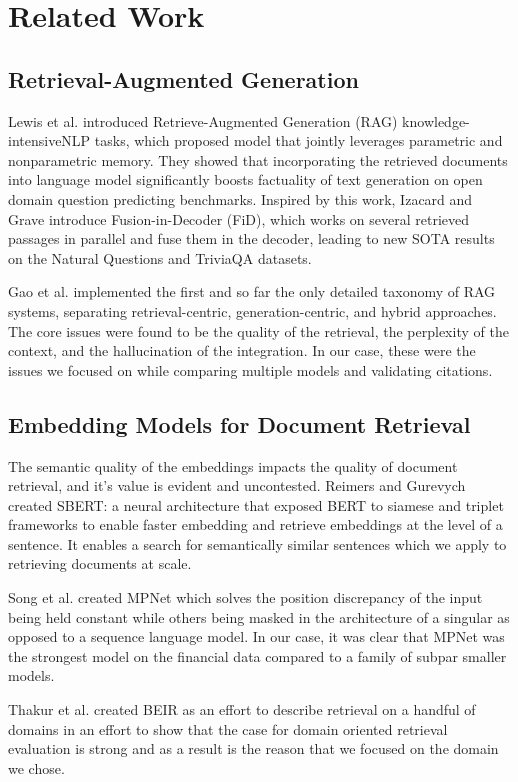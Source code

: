 \documentclass[runningheads]{llncs}
\begin{document}
\section{Related Work}

\subsection{Retrieval-Augmented Generation}

Lewis et al. \cite{lewis2020rag} introduced Retrieve-Augmented Generation (RAG) knowledge-intensiveNLP tasks, which proposed model that jointly leverages parametric and nonparametric memory. They showed that incorporating the retrieved documents into language model significantly boosts factuality of text generation on open domain question predicting benchmarks. Inspired by this work, Izacard and Grave \cite{izacard2021fid} introduce Fusion-in-Decoder (FiD), which works on several retrieved passages in parallel and fuse them in the decoder, leading to new SOTA results on the Natural Questions and TriviaQA datasets.

Gao et al. \cite{gao2023ragsurvey} implemented the first and so far the only detailed taxonomy of RAG systems, separating retrieval-centric, generation-centric, and hybrid approaches. The core issues were found to be the quality of the retrieval, the perplexity of the context, and the hallucination of the integration. In our case, these were the issues we focused on while comparing multiple models and validating citations.

\subsection{Embedding Models for Document Retrieval} \par The semantic quality of the embeddings impacts the quality of document retrieval, and it's value is evident and uncontested. Reimers and Gurevych \cite{reimers2019sentencebert} created SBERT: a neural architecture that exposed BERT to siamese and triplet frameworks to enable faster embedding and retrieve embeddings at the level of a sentence. It enables a search for semantically similar sentences which we apply to retrieving documents at scale.

Song et al. \cite{song2020mpnet} created MPNet which solves the position discrepancy of the input being held constant while others being masked in the architecture of a singular as opposed to a sequence language model. In our case, it was clear that MPNet was the strongest model on the financial data compared to a family of subpar smaller models. \par Thakur et al. \cite{thakur2021beir} created BEIR as an effort to describe retrieval on a handful of domains in an effort to show that the case for domain oriented retrieval evaluation is strong and as a result is the reason that we focused on the domain we chose.
\end{document}
